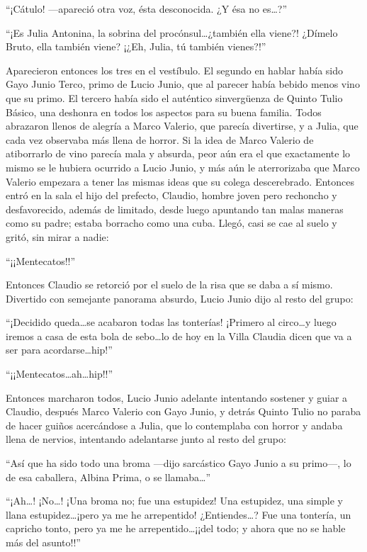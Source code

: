 \documentclass[11pt,openany]{book}
\begin{document}
“¡Cátulo! —apareció otra voz, ésta desconocida. ¿Y ésa no es\dots?” 

“¡Es Julia Antonina, la sobrina del procónsul\dots ¿también ella viene?! ¿Dímelo Bruto, ella también viene? ¡¿Eh, Julia, tú también vienes?!” 

Aparecieron entonces los tres en el vestíbulo. El segundo en hablar había sido Gayo Junio Terco, primo de Lucio Junio, que al parecer había bebido menos vino que su primo. El tercero había sido el auténtico sinvergüenza de Quinto Tulio Básico, una deshonra en todos los aspectos para su buena familia. Todos abrazaron llenos de alegría a Marco Valerio, que parecía divertirse, y a Julia, que cada vez observaba más llena de horror. Si la idea de Marco Valerio de atiborrarlo de vino parecía mala y absurda, peor aún era el que exactamente lo mismo se le hubiera ocurrido a Lucio Junio, y más aún le aterrorizaba que Marco Valerio empezara a tener las mismas ideas que su colega descerebrado. Entonces entró en la sala el hijo del prefecto, Claudio, hombre joven pero rechoncho y desfavorecido, además de limitado, desde luego apuntando tan malas maneras como su padre; estaba borracho como una cuba. Llegó, casi se cae al suelo y gritó, sin mirar a nadie: 

“¡¡Mentecatos!!” 

Entonces Claudio se retorció por el suelo de la risa que se daba a sí mismo. Divertido con semejante panorama absurdo, Lucio Junio dijo al resto del grupo: 

“¡Decidido queda\dots se acabaron todas las tonterías! ¡Primero al circo\dots y luego iremos a casa de esta bola de sebo\dots lo de hoy en la Villa Claudia dicen que va a ser para acordarse\dots hip!” 

“¡¡Mentecatos\dots ah\dots hip!!” 

Entonces marcharon todos, Lucio Junio adelante intentando sostener y guiar a Claudio, después Marco Valerio con Gayo Junio, y detrás Quinto Tulio no paraba de hacer guiños acercándose a Julia, que lo contemplaba con horror y andaba llena de nervios, intentando adelantarse junto al resto del grupo: 

“Así que ha sido todo una broma —dijo sarcástico Gayo Junio a su primo—, lo de esa caballera, Albina Prima, o se llamaba\dots” 

“¡Ah\dots! ¡No\dots! ¡Una broma no; fue una estupidez! Una estupidez, una simple y llana estupidez\dots ¡pero ya me he arrepentido! ¿Entiendes\dots? Fue una tontería, un capricho tonto, pero ya me he arrepentido\dots ¡¡del todo; y ahora que no se hable más del asunto!!” 
\end{document}
